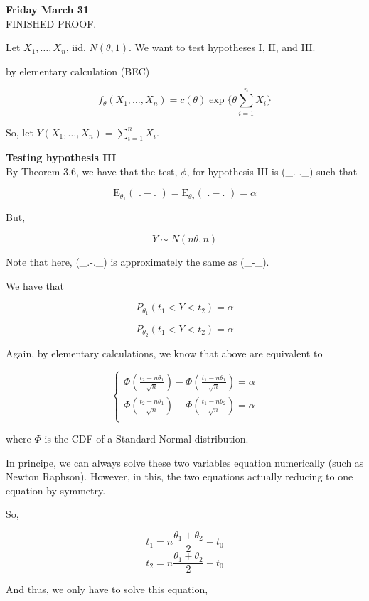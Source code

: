\documentclass[11pt,fleqn]{book} %
\newcommand{\E}{\mathrm{E}}
\begin{document}
\textbf{Friday March 31}\\

FINISHED PROOF. 

\begin{example}
	Let $X_1, \dots, X_n$, iid, $N(\theta, 1)$. We want to test hypotheses I, II, and III. 

	by elementary calculation (BEC) 

			$$f_\theta (X_1, \dots, X_n) = c(\theta) \exp\{\theta \sum^n_{i = 1} X_i \} $$

	So, let $Y(X_1, \dots, X_n) = \sum^n_{i=1} X_i$. 

	\textbf{Testing hypothesis III}\\

	By Theorem 3.6, we have that the test, $\phi$, for hypothesis III is (\_.-.\_) such that

			$$\E_{\theta_1} (\_.-.\_) = \E_{\theta_2} (\_.-.\_) = \alpha $$

	But, 

			$$Y \sim N(n\theta, n) $$

	Note that here, (\_.-.\_) is approximately the same as (\_-\_).

	We have that 

			$$P_{\theta_1} (t_1 < Y < t_2) = \alpha $$

			$$P_{\theta_2} (t_1< Y < t_2) = \alpha $$


	Again, by elementary calculations, we know that above are equivalent to 

		$$ \left\{ \begin{array}{l}
			\Phi(\frac{t_2 - n \theta_1}{\sqrt{n}}) - \Phi(\frac{t_1 - n \theta_1}{\sqrt{n}}) = \alpha\\
			\Phi(\frac{t_2 - n \theta_1}{\sqrt{n}}) - \Phi(\frac{t_1 - n\theta_2}{\sqrt{n}}) = \alpha\\

		\end{array} \right.$$


	where $\Phi$ is the CDF of a Standard Normal distribution. 

	In principe, we can always solve these two variables equation numerically (such as Newton Raphson). However, in this, the two equations actually reducing to one equation by symmetry. 

	So, 

			$$t_1 = n \frac{\theta_1 + \theta_2}{2} - t_0 $$
			$$t_2 = n \frac{\theta_1 + \theta_2}{2} + t_0 $$

	And thus, we only have to solve this equation, 


\end{example}
\end{document}
